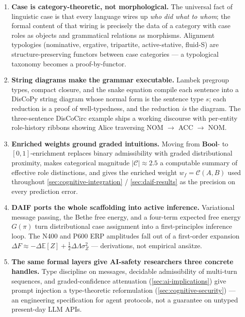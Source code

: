 \documentclass[
]{article}
\begin{document}
\begin{enumerate}
\def\labelenumi{\arabic{enumi}.}
\item
  \textbf{Case is category-theoretic, not morphological.} The universal
  fact of linguistic case is that every language wires up \emph{who did
  what to whom}; the formal content of that wiring is precisely the data
  of a category with case roles as objects and grammatical relations as
  morphisms. Alignment typologies (nominative, ergative, tripartite,
  active-stative, fluid-S) are structure-preserving functors between
  case categories --- a typological taxonomy becomes a proof-by-functor.
\item
  \textbf{String diagrams make the grammar executable.} Lambek pregroup
  types, compact closure, and the snake equation compile each sentence
  into a DisCoPy string diagram whose normal form is the sentence type
  \(s\); each reduction is a proof of well-typedness, and the reduction
  \emph{is} the diagram. The three-sentence DisCoCirc example ships a
  working discourse with per-entity role-history ribbons showing Alice
  traversing NOM \texorpdfstring{\ensuremath{\to}}{->} ACC \texorpdfstring{\ensuremath{\to}}{->} NOM.
\item
  \textbf{Enriched weights ground graded intuitions.} Moving from
  \(\mathbf{Bool}\)- to \([0,1]\)-enrichment replaces binary
  admissibility with graded distributional proximity, makes categorical
  magnitude \(|\mathcal{C}| \approx 2.5\) a computable summary of
  effective role distinctions, and gives the enriched weight
  \(w_f = \mathcal{C}(A, B)\) used throughout
  \autoref{sec:cognitive-integration} / \autoref{sec:daif-results} as
  the precision on every prediction error.
\item
  \textbf{DAIF ports the whole scaffolding into active inference.}
  Variational message passing, the Bethe free energy, and a four-term
  expected free energy \(G(\pi)\) turn distributional case assignment
  into a first-principles inference loop. The N400 and P600 ERP
  amplitudes fall out of a first-order expansion
  \(\Delta F \approx -\Delta \mathbb{E}[Z] + \tfrac{1}{2}\Delta\Lambda\sigma_Z^{2}\)
  --- derivations, not empirical ansätze.
\item
  \textbf{The same formal layers give AI-safety researchers three
  concrete handles.} Type discipline on messages, decidable
  admissibility of multi-turn sequences, and graded-confidence
  attenuation (\autoref{sec:ai-implications}) give prompt injection a
  type-theoretic reformulation (\autoref{sec:cognitive-security}) --- an
  engineering specification for agent protocols, not a guarantee on
  untyped present-day LLM APIs.
\end{enumerate}
\end{document}
